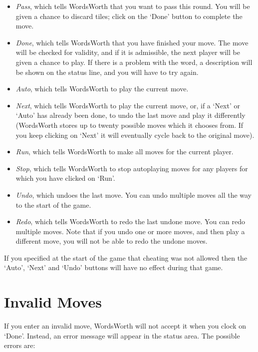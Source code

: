 \begin{itemize}
\item {\em Pass}, which tells WordsWorth that you want to pass this
round. You will be given a chance to discard tiles; click on the
`Done' button to complete the move.
\item {\em Done}, which tells WordsWorth that you have finished your
move. The move will be checked for validity, and if it is admissible,
the next player will be given a chance to play. If there is a problem
with the word, a description will be shown on the status line, and
you will  have to try again.
\item {\em Auto}, which tells WordsWorth to play the current move.
\item {\em Next}, which tells WordsWorth to play the current move,
or, if a `Next' or `Auto' has already been done, to undo the last
move and play it differently (WordsWorth stores up to twenty possible
moves which it chooses from. If you keep clicking on `Next' it will
eventually cycle back to the original move).
\item {\em Run}, which tells WordsWorth to make all moves for the
current player. 
\item {\em Stop}, which tells WordsWorth to stop autoplaying moves
for any players for which you have clicked on `Run'.
\item {\em Undo}, which undoes the last move. You can undo multiple
moves all the way to the start of the game.
\item {\em Redo}, which tells WordsWorth to redo the last undone
move. You can redo multiple moves. Note that if you undo one or more
moves, and then play a different move, you will not be able to redo
the undone moves.
\end{itemize}

If you specified at the start of the game that cheating was not allowed
then the `Auto', `Next' and `Undo' buttons will have no effect during
that game.

\section{Invalid Moves}

If you enter an invalid move, WordsWorth will not accept it when
you clock on `Done'. Instead, an error message will appear in the
status area. The possible errors are:

